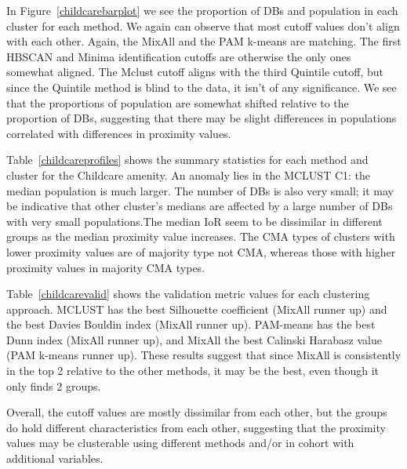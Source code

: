 \documentclass[11pt, a4paper]{article}
\begin{document}
In Figure~\ref{childcarebarplot} we see the proportion of DBs and population in each cluster for each method. We again can observe that most cutoff values don’t align with each other. Again, the MixAll and the PAM k-means are matching. The first HBSCAN and Minima identification cutoffs are otherwise the only ones somewhat aligned. The Mclust cutoff aligns with the third Quintile cutoff, but since the Quintile method is blind to the data, it isn’t of any significance. We see that the proportions of population are somewhat shifted relative to the proportion of DBs, suggesting that there may be slight differences in populations correlated with differences in proximity values.
\par
Table~\ref{childcareprofiles} shows the summary statistics for each method and cluster for the Childcare amenity. An anomaly lies in the MCLUST C1: the median population is much larger. The number of DBs is also very small; it may be indicative that other cluster’s medians are affected by a large number of DBs with very small populations.The median IoR seem to be dissimilar in different groups as the median proximity value increases. The CMA types of clusters with lower proximity values are of majority type not CMA, whereas those with higher proximity values in majority CMA types.
\par
Table~\ref{childcarevalid} shows the validation metric values for each clustering approach. MCLUST has the best Silhouette coefficient (MixAll runner up) and the best Davies Bouldin index (MixAll runner up).  PAM-means has the best Dunn index (MixAll runner up), and MixAll the best Calinski Harabasz value (PAM k-means runner up). These results suggest that since MixAll is consistently in the top 2 relative to the other methods, it may be the best, even though it only finds 2 groups.
\par
Overall, the cutoff values are mostly dissimilar from each other, but the groups do hold different characteristics from each other, suggesting that the proximity values may be clusterable using different methods and/or in cohort with additional variables.
\end{document}
